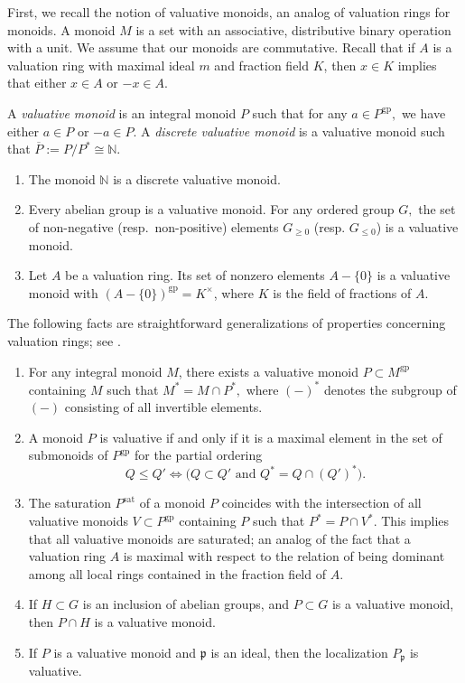 \documentclass[10pt]{amsart}
\newcommand{\N}{\mathbb{N}}
\newcommand{\gp}{\mathrm{gp}}
\newcommand{\sat}{\mathrm{sat}}
\begin{document}
First, 
we recall the notion of valuative monoids, 
an analog of valuation rings for monoids. 
A monoid $M$ is a set with an associative, distributive binary operation with a unit. We assume that our monoids are commutative.
Recall that if $A$ is a valuation ring with maximal ideal $m$ and fraction field $K$, then $x \in K$ implies that either $x \in A$ or $-x \in A$.

\begin{definition}
\cite[§I.2.4]{Ogu}
A \emph{valuative monoid} is an integral monoid \(P\) such that for any \(a \in P^{\gp},\) we have either \(a \in P\) or \(-a \in P.\) 
A \textit{discrete valuative monoid} is a valuative monoid such that $\overline{P} := P/P^* \cong \N.$
\end{definition}

\begin{example}
\begin{enumerate}
\item[(i)] The monoid $\N$ is a discrete valuative monoid.
\item[(ii)] Every abelian group
is a valuative monoid. 
For any ordered group \(G,\) the set of non-negative (resp.\ non-positive) elements 
\(G_{\geq 0}\) (resp. \(G_{\leq 0}\)) is a valuative monoid.
\item[(iii)] Let $A$ be a valuation ring. 
Its set of nonzero elements $A-\{0\}$ is a valuative monoid with 
$(A-\{0\})^{\gp} = K^\times$, where $K$ is the field of fractions of $A$.
\end{enumerate}
\end{example}

\begin{properties}
The following facts are straightforward generalizations of properties concerning valuation rings; see \cite[§I.2.4]{Ogu}.
\begin{enumerate}
\item[(i)] For any integral monoid \(M\), there exists a valuative monoid \(P \subset M^{\gp}\) containing \(M\) such that \(M^* = M \cap P^*,\) where \((-)^*\) denotes the subgroup of \((-)\) consisting of all invertible elements.
\item[(ii)] A monoid \(P\) is valuative if and only if it is a maximal element in the set of submonoids of \(P^{\gp}\) for the partial ordering
\[Q \leq Q' \Leftrightarrow \big( Q \subset Q' \text{ and } Q^* = Q\cap (Q')^* \big).\]
\item[(iii)] The saturation \(P^{\sat}\) of a monoid \(P\) coincides with the intersection of all valuative monoids \(V \subset P^{\gp}\) containing \(P\) such that \(P^* = P \cap V^*.\) This implies that all valuative monoids are saturated; an analog of the fact that a valuation ring $A$ is maximal with respect to the relation of being dominant among all local rings contained in the fraction field of $A$.
\item[(iv)] 
If $H \subset G$ is an inclusion of abelian groups, and $P \subset G$ is a valuative monoid, then $P \cap H$ is a valuative monoid.
\item[(v)] If $P$ is a valuative monoid and $\mathfrak{p}$ is an ideal, then the localization $P_\mathfrak{p}$ is valuative.
\end{enumerate}
\end{properties}
\end{document}

